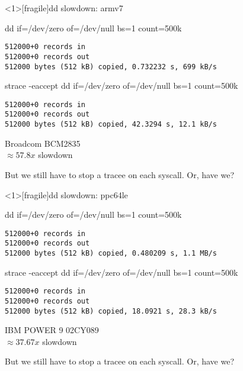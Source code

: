 \documentclass[unicode,aspectratio=169]{beamer}
\begin{document}
\begin{frame}<1>[fragile]{dd slowdown: armv7}
\begin{block}{\large dd if=/dev/zero of=/dev/null bs=1 count=500k}
\begin{verbatim}
512000+0 records in
512000+0 records out
512000 bytes (512 kB) copied, 0.732232 s, 699 kB/s
\end{verbatim}
\end{block}
\begin{block}{\large strace -eaccept dd if=/dev/zero of=/dev/null bs=1 count=500k}
\begin{verbatim}
512000+0 records in
512000+0 records out
512000 bytes (512 kB) copied, 42.3294 s, 12.1 kB/s
\end{verbatim}
\end{block}
\begin{scriptsize}
Broadcom BCM2835 \\
$\approx 57.8x$ slowdown \\
\end{scriptsize}
\pause
But we still have to stop a tracee on each syscall. Or, have we?
\end{frame}

\begin{frame}<1>[fragile]{dd slowdown: ppc64le}
\begin{block}{\large dd if=/dev/zero of=/dev/null bs=1 count=500k}
\begin{verbatim}
512000+0 records in
512000+0 records out
512000 bytes (512 kB) copied, 0.480209 s, 1.1 MB/s
\end{verbatim}
\end{block}
\begin{block}{\large strace -eaccept dd if=/dev/zero of=/dev/null bs=1 count=500k}
\begin{verbatim}
512000+0 records in
512000+0 records out
512000 bytes (512 kB) copied, 18.0921 s, 28.3 kB/s
\end{verbatim}
\end{block}
\begin{scriptsize}
IBM POWER 9 02CY089 \\
$\approx 37.67x$ slowdown \\
\end{scriptsize}
\pause
But we still have to stop a tracee on each syscall. Or, have we?
\end{frame}
\end{document}

